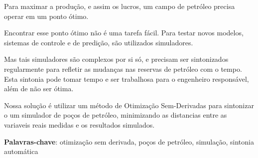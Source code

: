 
\setlength{\absparsep}{18pt} %
\begin{resumo}

Para maximar a produção, e assim os lucros, um campo de petróleo precisa operar em um ponto ótimo.

Encontrar esse ponto ótimo não é uma tarefa fácil. Para testar novos modelos, sistemas de controle e de predição, são utilizados simuladores.

Mas tais simuladores são complexos por si só, e precisam ser sintonizados regularmente para refletir as mudanças nas reservas de petróleo com o tempo. Esta sintonia pode tomar tempo e ser trabalhosa para o engenheiro responsável, além de não ser ótima.

Nossa solução é utilizar um método de Otimização Sem-Derivadas para sintonizar o um simulador de poços de petróleo, minimizando as distancias entre as variaveis reais medidas e os resultados simulados.

 \textbf{Palavras-chave}: otimização sem derivada, poços de petróleo, simulação, sintonia automática 
\end{resumo}

